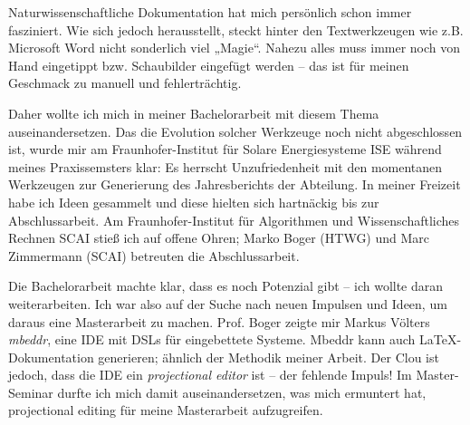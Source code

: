 Naturwissenschaftliche Dokumentation hat mich persönlich schon immer fasziniert.
Wie sich jedoch herausstellt, steckt hinter den Textwerkzeugen wie z.B. Microsoft Word
nicht sonderlich viel „Magie“. Nahezu alles muss immer noch von Hand eingetippt
bzw. Schaubilder eingefügt werden -- das ist für meinen Geschmack zu manuell und fehlerträchtig.

Daher wollte ich mich in meiner Bachelorarbeit \citep{Hodapp} mit diesem Thema auseinandersetzen.
Das die Evolution solcher Werkzeuge noch nicht abgeschlossen ist, wurde
mir am Fraunhofer-Institut für Solare Energiesysteme ISE während meines Praxissemsters klar:
Es herrscht Unzufriedenheit mit den momentanen Werkzeugen zur Generierung des Jahresberichts der Abteilung.
In meiner Freizeit habe ich Ideen gesammelt und diese hielten sich hartnäckig
bis zur Abschlussarbeit.
Am Fraunhofer-Institut für Algorithmen und Wissenschaftliches Rechnen SCAI stieß ich auf
offene Ohren; Marko Boger (HTWG) und Marc Zimmermann (SCAI) betreuten die Abschlussarbeit.

Die Bachelorarbeit machte klar,
dass es noch Potenzial gibt -- ich wollte daran weiterarbeiten.
Ich war also auf der Suche nach neuen Impulsen und Ideen, um daraus eine Masterarbeit zu machen.
Prof. Boger zeigte mir Markus Völters \emph{mbeddr}, eine IDE mit DSLs für eingebettete Systeme.
Mbeddr kann auch LaTeX-Dokumentation generieren; ähnlich der Methodik meiner Arbeit.
Der Clou ist jedoch, dass die IDE ein \emph{projectional editor} ist --
der fehlende Impuls! Im Master-Seminar durfte ich mich damit auseinandersetzen,
was mich ermuntert hat, projectional editing für meine Masterarbeit aufzugreifen.

